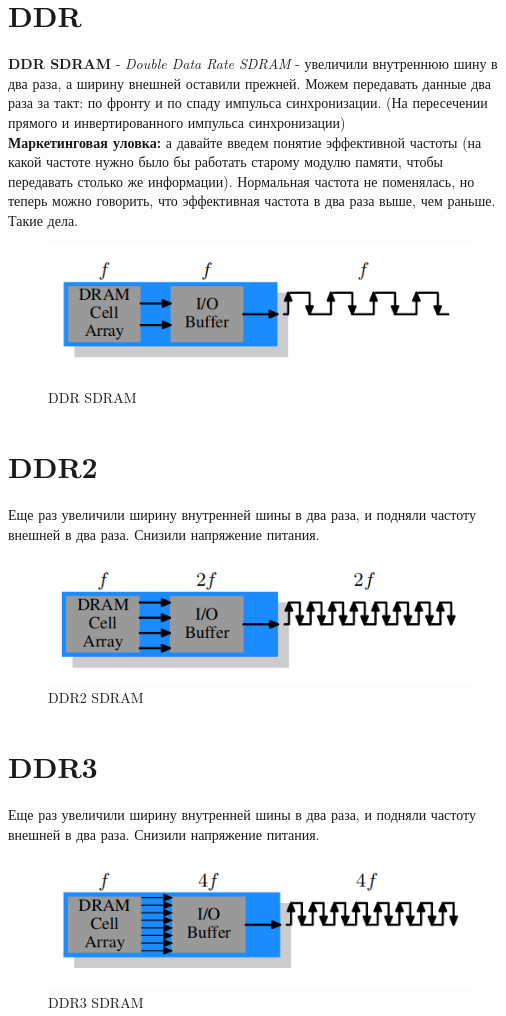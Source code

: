 \documentclass[12pt, a4paper]{article}
\begin{document}
\section{DDR}
\textbf{DDR SDRAM} - \textit{Double Data Rate SDRAM} - увеличили внутреннюю шину в два раза, а ширину внешней оставили прежней. Можем передавать данные два раза за такт: по фронту и по спаду импульса синхронизации. (На пересечении прямого и инвертированного импульса синхронизации)\\
\textbf{Маркетинговая уловка:} а давайте введем понятие эффективной частоты (на какой частоте нужно было бы работать старому модулю памяти, чтобы передавать столько же информации). Нормальная частота не поменялась, но теперь можно говорить, что эффективная частота в два раза выше, чем раньше. Такие дела.
\begin{figure}[h]
    \centering
    \includegraphics[scale=0.6]{./images/DDR_SDRAM.png}
    \caption{DDR SDRAM}
    \label{fig:DDR_SDRAM}
\end{figure}
\section{DDR2}
Еще раз увеличили ширину внутренней шины в два раза, и подняли частоту внешней в два раза. Снизили напряжение питания. 
\begin{figure}[h]
    \centering
    \includegraphics[scale=0.6]{./images/DDR2_SDRAM.png}
    \caption{DDR2 SDRAM}
    \label{fig:DDR2_SDRAM}
\end{figure}
\section{DDR3}
Еще раз увеличили ширину внутренней шины в два раза, и подняли частоту внешней в два раза. Снизили напряжение питания.
\begin{figure}[h]
    \centering
    \includegraphics[scale=0.6]{./images/DDR3_SDRAM.png}
    \caption{DDR3 SDRAM}
    \label{fig:DDR2_SDRAM}
\end{figure}
\end{document}
